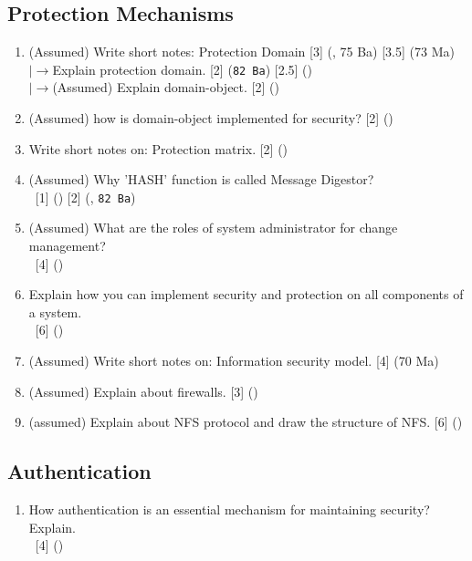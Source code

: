 \documentclass[12pt]{article}
\newcommand{\lb}{\\$\left|\rightarrow\right.$}
\newcommand{\enter}{\\\textcolor{white}{1}}
\begin{document}
	\subsection{Protection Mechanisms}
		\begin{enumerate}[noitemsep, topsep=0pt]
			\item (Assumed) Write short notes: Protection Domain \hfill [3] (, 75 Ba) [3.5] (73 Ma)
			\lb Explain protection domain. \hfill [2] (\texttt{82 Ba}) [2.5] ()
			\lb (Assumed) Explain domain-object. \hfill [2] ()

			\item (Assumed) how is domain-object implemented for security? \hfill [2] ()

			\item Write short notes on: Protection matrix. \hfill [2] ()

			\item (Assumed) Why 'HASH' function is called Message Digestor?
			\enter\hfill [1] () [2] (, \texttt{82 Ba})

			\item (Assumed) What are the roles of system administrator for change management?
			\enter\hfill [4] ()

			\item Explain how you can implement security and protection on all components of a system.
			\enter\hfill [6] ()

			\item (Assumed) Write short notes on: Information security model. \hfill [4] (70 Ma)

			\item (Assumed) Explain about firewalls. \hfill [3] ()

			\item (assumed) Explain about NFS protocol and draw the structure of NFS. \hfill [6] ()
		\end{enumerate}

	\subsection{Authentication}
		\begin{enumerate}[noitemsep, topsep=0pt]
			\item How authentication is an essential mechanism for maintaining security? Explain.
			\enter\hfill [4] ()
		\end{enumerate}
\end{document}

